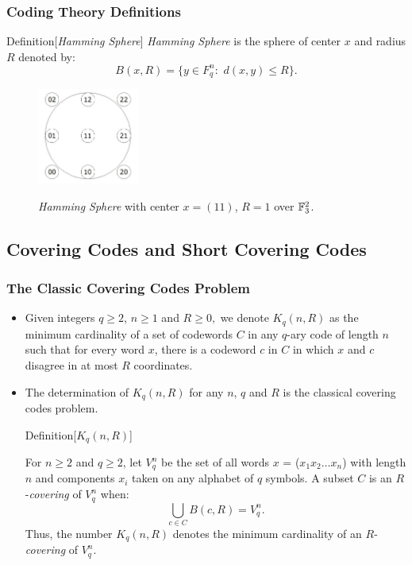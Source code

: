 \documentclass{beamer}
\begin{document}
\begin{frame}
  \frametitle{Coding Theory Definitions}
{

\begin{block}{Definition}[\textit{Hamming Sphere}]
\textit{Hamming Sphere} is the sphere of center $x$ and radius $R$ denoted by: 
\begin{equation}
\label{esfera}
B(x,R)=\{y \in F_{q}^{n}:\,\,d(x,y)\leq R\}.
\end{equation}
\end{block}

\begin{figure}[htbp]
	\centering
		\includegraphics[width=0.30\textwidth]{images/boundingsphere.jpg}
	\label{fig:bouding}
	\caption{\textsl{Hamming Sphere} with center $x = (11)$, $R=1$ over $\Bbb{F}_{3}^{2}$.}
\end{figure}

}
\end{frame}

\subsection{Covering Codes and Short Covering Codes}

\begin{frame}
  \frametitle{The Classic Covering Codes Problem}
{
	
\begin{itemize}
	\item<1-> Given integers $q\geq 2$, $n\geq 1$ and $R\geq 0,$ we denote $K_{q}(n,R)$ as the minimum cardinality of a set of codewords $C$ in any $q$-ary code of length $n$ such that for every word $x$, there is a codeword $c$ in $C$ in which $x$ and $c$ disagree in at most $R$ coordinates.
	\item<2-> The determination of $K_{q}(n,R)$ for any $n$, $q$ and $R$ is the classical covering codes problem.
	
\begin{block}{Definition}[$K_{q}(n,R)$]
{
\scriptsize
	For $n\geq 2$ and $q\geq 2$, let $V_{q}^{n}$ be the set of all words $x$ = ($%
x_{1}x_{2}\ldots x_{n}$) with length $n$ and components $x_{i}$
taken on any alphabet of $q$ symbols. A subset $C$ is an $R$-\textit{covering} of $V_{q}^{n}$ when:
\[
\bigcup_{c\in C}B(c,R)=V_{q}^{n}.
\]
Thus, the number $K_{q}(n,R)$ denotes the minimum cardinality of an $R$-%
{\it covering} of $V_{q}^{n}.$

}
\end{block}
	
\end{itemize}
}
\end{frame}
\end{document}
